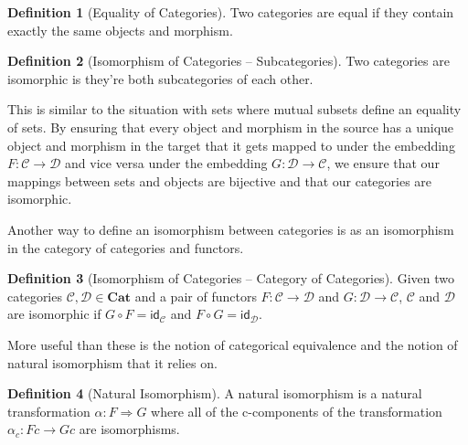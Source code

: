 \documentclass[12pt]{article}
\theoremstyle{definition}
\newtheorem{definition}{Definition}
\begin{document}
\begin{definition}[Equality of Categories]
    Two categories are equal if they contain exactly the same objects and morphism.
\end{definition}

\begin{definition}[Isomorphism of Categories -- Subcategories]
    Two categories are isomorphic is they're both subcategories of each other.
\end{definition}
This is similar to the situation with sets where mutual subsets define an equality of sets.
By ensuring that every object and morphism in the source has a unique object and morphism in the target that it gets mapped to under the embedding $F:\mathcal{C} \rightarrow \mathcal{D}$ and vice versa under the embedding $G:\mathcal{D} \rightarrow \mathcal{C}$,
we ensure that our mappings between sets and objects are bijective and that our categories are isomorphic.

Another way to define an isomorphism between categories is as an isomorphism in the category of categories and functors.
\begin{definition}[Isomorphism of Categories -- Category of Categories]
    Given two categories $\mathcal{C}, \mathcal{D} \in \textbf{Cat}$ and a pair of functors $F:\mathcal{C} \rightarrow \mathcal{D}$ and $G:\mathcal{D} \rightarrow \mathcal{C}$,
    $\mathcal{C}$ and $\mathcal{D}$ are isomorphic if $G \circ F = \mathsf{id_\mathcal{C}}$ and $F \circ G = \mathsf{id_\mathcal{D}}$.
\end{definition}


More useful than these is the notion of categorical equivalence and the notion of natural isomorphism that it relies on.

\begin{definition}[Natural Isomorphism]
    A natural isomorphism is a natural transformation $\alpha:F\Rightarrow G$ where all of the c-components of the transformation $\alpha_{c}:Fc\rightarrow Gc$ are isomorphisms.
\end{definition}
\end{document}
